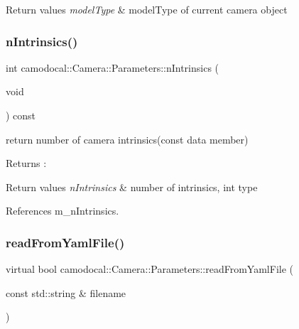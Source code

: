 \begin{DoxyRetVals}{Return values}
{\em model\+Type} & model\+Type of current camera object \\
\hline
\end{DoxyRetVals}
\mbox{\label{classcamodocal_1_1Camera_1_1Parameters_aa31b8ba0c96f14452fe61613ec8f50fa}} 
\subsubsection{\texorpdfstring{n\+Intrinsics()}{nIntrinsics()}}
{\footnotesize\ttfamily int camodocal\+::\+Camera\+::\+Parameters\+::n\+Intrinsics (\begin{DoxyParamCaption}\item[{void}]{ }\end{DoxyParamCaption}) const}



return number of camera intrinsics(const data member) 

\begin{DoxyReturn}{Returns}
\+: 
\end{DoxyReturn}

\begin{DoxyRetVals}{Return values}
{\em n\+Intrinsics} & number of intrinsics, int type \\
\hline
\end{DoxyRetVals}


References m\+\_\+n\+Intrinsics.

\mbox{\label{classcamodocal_1_1Camera_1_1Parameters_a7968503df2a99e022a0c52bf7dafe531}} 
\subsubsection{\texorpdfstring{read\+From\+Yaml\+File()}{readFromYamlFile()}}
{\footnotesize\ttfamily virtual bool camodocal\+::\+Camera\+::\+Parameters\+::read\+From\+Yaml\+File (\begin{DoxyParamCaption}\item[{const std\+::string \&}]{filename }\end{DoxyParamCaption})\hspace{0.3cm}{\ttfamily [pure virtual]}}



